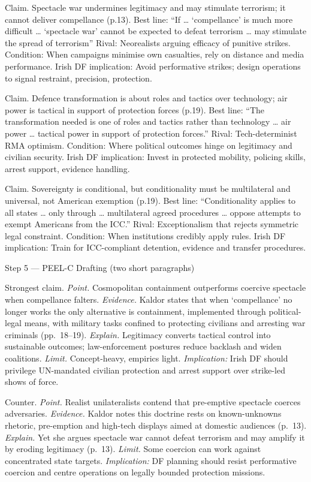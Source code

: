 Claim. Spectacle war undermines legitimacy and may stimulate terrorism; it cannot deliver compellance (p.13). Best line: “If … ‘compellance’ is much more difficult … ‘spectacle war’ cannot be expected to defeat terrorism … may stimulate the spread of terrorism” Rival: Neorealists arguing efficacy of punitive strikes. Condition: When campaigns minimise own casualties, rely on distance and media performance. Irish DF implication: Avoid performative strikes; design operations to signal restraint, precision, protection.

Claim. Defence transformation is about roles and tactics over technology; air power is tactical in support of protection forces (p.19). Best line: “The transformation needed is one of roles and tactics rather than technology … air power … tactical power in support of protection forces.” Rival: Tech-determinist RMA optimism. Condition: Where political outcomes hinge on legitimacy and civilian security. Irish DF implication: Invest in protected mobility, policing skills, arrest support, evidence handling.

Claim. Sovereignty is conditional, but conditionality must be multilateral and universal, not American exemption (p.19). Best line: “Conditionality applies to all states … only through … multilateral agreed procedures … oppose attempts to exempt Americans from the ICC.” Rival: Exceptionalism that rejects symmetric legal constraint. Condition: When institutions credibly apply rules. Irish DF implication: Train for ICC-compliant detention, evidence and transfer procedures.

Step 5 — PEEL-C Drafting (two short paragraphs)

Strongest claim. \textit{Point.} Cosmopolitan containment outperforms coercive spectacle when compellance falters. \textit{Evidence.} Kaldor states that when ‘compellance’ no longer works the only alternative is containment, implemented through political-legal means, with military tasks confined to protecting civilians and arresting war criminals (pp.~18–19). \textit{Explain.} Legitimacy converts tactical control into sustainable outcomes; law-enforcement postures reduce backlash and widen coalitions. \textit{Limit.} Concept-heavy, empirics light. \textit{Implication:} Irish DF should privilege UN-mandated civilian protection and arrest support over strike-led shows of force.

Counter. \textit{Point.} Realist unilateralists contend that pre-emptive spectacle coerces adversaries. \textit{Evidence.} Kaldor notes this doctrine rests on known-unknowns rhetoric, pre-emption and high-tech displays aimed at domestic audiences (p.~13). \textit{Explain.} Yet she argues spectacle war cannot defeat terrorism and may amplify it by eroding legitimacy (p.~13). \textit{Limit.} Some coercion can work against concentrated state targets. \textit{Implication:} DF planning should resist performative coercion and centre operations on legally bounded protection missions.


